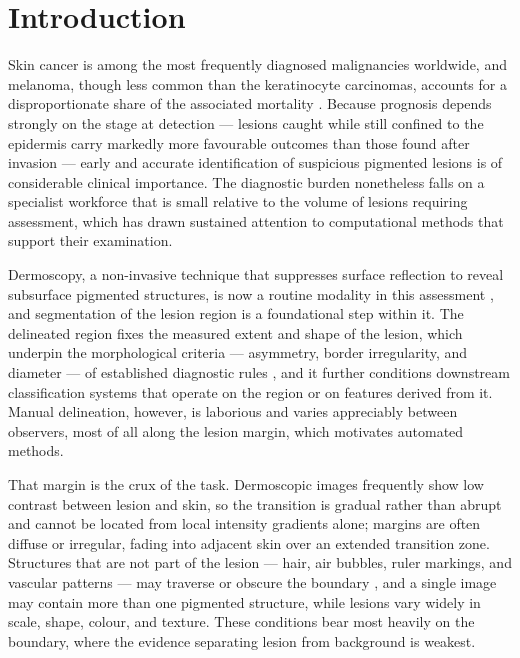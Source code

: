 \section{Introduction}
\label{sec:intro}

Skin cancer is among the most frequently diagnosed malignancies worldwide, and melanoma, though less common than the keratinocyte carcinomas, accounts for a disproportionate share of the associated mortality \cite{ref1}. Because prognosis depends strongly on the stage at detection --- lesions caught while still confined to the epidermis carry markedly more favourable outcomes than those found after invasion --- early and accurate identification of suspicious pigmented lesions is of considerable clinical importance. The diagnostic burden nonetheless falls on a specialist workforce that is small relative to the volume of lesions requiring assessment, which has drawn sustained attention to computational methods that support their examination.

Dermoscopy, a non-invasive technique that suppresses surface reflection to reveal subsurface pigmented structures, is now a routine modality in this assessment \cite{ref2}, and segmentation of the lesion region is a foundational step within it. The delineated region fixes the measured extent and shape of the lesion, which underpin the morphological criteria --- asymmetry, border irregularity, and diameter --- of established diagnostic rules \cite{ref3}, and it further conditions downstream classification systems that operate on the region or on features derived from it. Manual delineation, however, is laborious and varies appreciably between observers, most of all along the lesion margin, which motivates automated methods.

That margin is the crux of the task. Dermoscopic images frequently show low contrast between lesion and skin, so the transition is gradual rather than abrupt and cannot be located from local intensity gradients alone; margins are often diffuse or irregular, fading into adjacent skin over an extended transition zone. Structures that are not part of the lesion --- hair, air bubbles, ruler markings, and vascular patterns --- may traverse or obscure the boundary \cite{ref2}, and a single image may contain more than one pigmented structure, while lesions vary widely in scale, shape, colour, and texture. These conditions bear most heavily on the boundary, where the evidence separating lesion from background is weakest.

